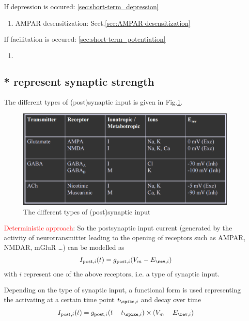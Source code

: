 If depression is occured: \ref{sec:short-term_depression}
\begin{enumerate}
  \item AMPAR desensitization: Sect.\ref{sec:AMPAR-desensitization}	
\end{enumerate}

If facilitation is occured: \ref{sec:short-term_potentiation}
\begin{enumerate}
  \item 
\end{enumerate}


\subsection{ * represent synaptic strength}
\label{sec:source-synaptic-input}

The different types of (post)synaptic input is given in
Fig.\ref{fig:synaptic-input}.

\begin{figure}[htb]
    \centerline{\includegraphics[height=5cm]{./images/synaptic-input.eps}}
    \caption{The different types of (post)synaptic
    input}\label{fig:synaptic-input}
\end{figure}


\textcolor{red}{Deterministic approach}:
So the postsynaptic input current (generated by the
activity of neurotransmitter leading to the opening of receptors such as AMPAR,
NMDAR, mGluR \ldots) can be modelled as
\begin{equation}
I_{\post,i}(t) = g_{\post,i} (V_m - E_{\rev,i}) 
\end{equation}
with $i$ represent one of the above receptors, i.e. a type of synaptic input.

Depending on the type of synaptic input, a functional form is used representing
the activating at a certain time point $t_{\spike, i}$ and decay over time
\begin{equation}
I_{\post,i}(t) = g_{\post,i}(t-t_{\spike,i}) \times (V_m - E_{\rev,i})
\end{equation}

